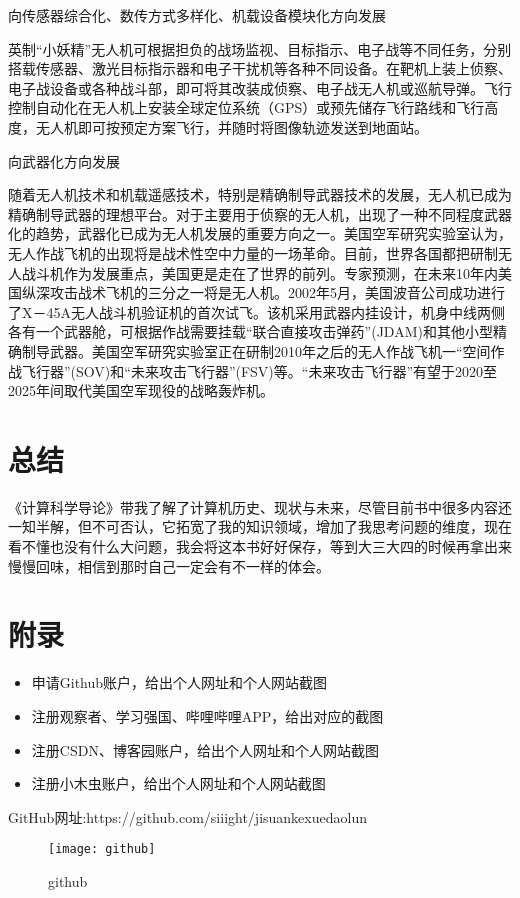 \documentclass{article}
\begin{document}
\begin{itemize}
向传感器综合化、数传方式多样化、机载设备模块化方向发展\par
英制“小妖精”无人机可根据担负的战场监视、目标指示、电子战等不同任务，分别搭载传感器、激光目标指示器和电子干扰机等各种不同设备。在靶机上装上侦察、电子战设备或各种战斗部，即可将其改装成侦察、电子战无人机或巡航导弹。飞行控制自动化在无人机上安装全球定位系统（GPS）或预先储存飞行路线和飞行高度，无人机即可按预定方案飞行，并随时将图像轨迹发送到地面站。\par
向武器化方向发展\par
随着无人机技术和机载遥感技术，特别是精确制导武器技术的发展，无人机已成为精确制导武器的理想平台。对于主要用于侦察的无人机，出现了一种不同程度武器化的趋势，武器化已成为无人机发展的重要方向之一。美国空军研究实验室认为，无人作战飞机的出现将是战术性空中力量的一场革命。目前，世界各国都把研制无人战斗机作为发展重点，美国更是走在了世界的前列。专家预测，在未来10年内美国纵深攻击战术飞机的三分之一将是无人机。2002年5月，美国波音公司成功进行了X－45A无人战斗机验证机的首次试飞。该机采用武器内挂设计，机身中线两侧各有一个武器舱，可根据作战需要挂载“联合直接攻击弹药”(JDAM)和其他小型精确制导武器。美国空军研究实验室正在研制2010年之后的无人作战飞机一“空间作战飞行器”(SOV)和“未来攻击飞行器”(FSV)等。“未来攻击飞行器”有望于2020至2025年间取代美国空军现役的战略轰炸机。\citep{a8}\par
\end{itemize}


\section{总结}
《计算科学导论》带我了解了计算机历史、现状与未来，尽管目前书中很多内容还一知半解，但不可否认，它拓宽了我的知识领域，增加了我思考问题的维度，现在看不懂也没有什么大问题，我会将这本书好好保存，等到大三大四的时候再拿出来慢慢回味，相信到那时自己一定会有不一样的体会。\par


\section{附录}
\begin{itemize}
    \item 申请Github账户，给出个人网址和个人网站截图
    \item 注册观察者、学习强国、哔哩哔哩APP，给出对应的截图
    \item 注册CSDN、博客园账户，给出个人网址和个人网站截图
    \item 注册小木虫账户，给出个人网址和个人网站截图
\end{itemize}
GitHub网址:https://github.com/siiight/jisuankexuedaolun\par
\begin{figure}[H]
\centering
\texttt{[image: github]}
\caption{github}
\label{fig:universe}
\end{figure}
\end{document}
